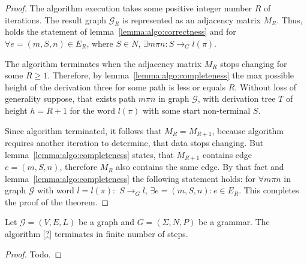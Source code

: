 \begin{proof}
    
    The algorithm execution takes some positive integer number $R$ of iterations. 
    The result graph $\mathcal{G}_R$ is represented as an adjacency matrix $M_R$.
    Thus, holds the statement of lemma~\ref{lemma:algo:correctness} and for  
    $\forall e = (m, S, n) \in E_R$, where $S \in N$, 
    $\exists m \pi n: S \to_G l(\pi)$.  
    
    The algorithm terminates when the adjacency matrix $M_R$ stops changing for 
    some $R \geq 1$. Therefore, by lemma~\ref{lemma:algo:completeness} the max 
    possible height of the derivation three for some path is less or equals $R$.
    Without loss of generality suppose, that exists path $m \pi n$ in graph
    $\mathcal{G}$, with derivation tree $T$ of height $h = R + 1$ 
    for the word $l(\pi)$ with some start non-terminal $S$. 
    
    Since algorithm terminated, it follows that $M_R = M_{R+1}$, 
    because algorithm requires another iteration to determine,
    that data stops changing. But lemma~\ref{lemma:algo:completeness} states, 
    that $M_{R+1}$ contains edge $e = (m, S, n)$, therefore $M_R$ also contains
    the same edge. By that fact and lemma~\ref{lemma:algo:completeness} the 
    following statement holds: for $\forall m \pi n$ in graph $\mathcal{G}$ 
    with word $l = l(\pi): $ $S \to_G l$, $\exists e = (m,S,n): e \in E_R$. 
    This completes the proof of the theorem.
    
\end{proof}{}

\begin{theorem}{}
    Let $\mathcal{G} = (V,E,L)$ be a graph and $G = (\Sigma, N, P)$ be a grammar.
    The algorithm \ref{?} terminates in finite number of steps.
\end{theorem}

\begin{proof}
    Todo.
\end{proof}{}